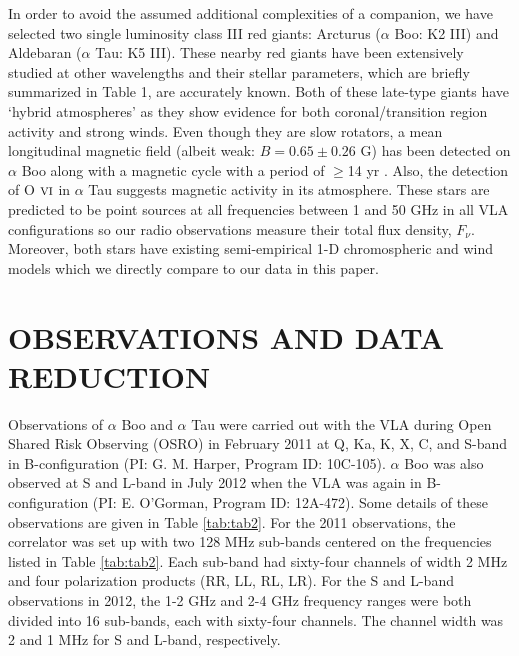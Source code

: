 \documentclass[iop]{emulateapj}
\begin{document}
In order to avoid the assumed additional complexities of a companion, we have selected two single luminosity class III red giants: Arcturus ($\alpha$ Boo: K2 III) and Aldebaran ($\alpha$ Tau: K5 III). These nearby red giants have been extensively studied at other wavelengths and their stellar parameters, which are briefly summarized in Table 1, are accurately known. Both of these late-type giants have `hybrid atmospheres' as they show evidence for both coronal/transition region activity and strong winds. Even though they are slow rotators, a mean longitudinal magnetic field (albeit weak: $B = 0.65 \pm 0.26$ G) has been detected on $\alpha$ Boo \citep{2011A&A...529A.100S} along with a magnetic cycle with a period of $\geq$14 yr \citep{2008ApJ...679.1531B}. Also, the detection of O $\textsc{vi}$ in $\alpha$ Tau \citep{2005ApJ...622..629D} suggests magnetic activity in its atmosphere. These stars are predicted to be point sources at all frequencies between 1 and 50 GHz in all VLA configurations so our radio observations measure their total flux density, $F_{\nu}$. Moreover, both stars have existing semi-empirical 1-D chromospheric and wind models which we directly compare to our data in this paper.

\section{OBSERVATIONS AND DATA REDUCTION}

Observations of $\alpha$ Boo and $\alpha$ Tau were carried out with the VLA during Open Shared Risk Observing (OSRO) in February 2011 at Q, Ka, K, X, C, and S-band in B-configuration (PI: G. M. Harper, Program ID: 10C-105). $\alpha$ Boo was also observed at S and L-band in July 2012 when the VLA was again in B-configuration (PI: E. O'Gorman, Program ID: 12A-472). Some details of these observations are given in Table \ref{tab:tab2}. For the 2011 observations, the correlator was set up with two 128 MHz sub-bands centered on the frequencies listed in Table \ref{tab:tab2}. Each sub-band had sixty-four channels of width 2 MHz and four polarization products (RR, LL, RL, LR). For the S and L-band observations in 2012, the 1-2 GHz and 2-4 GHz frequency ranges were both divided into 16 sub-bands, each with sixty-four channels. The channel width was 2 and 1 MHz for S and L-band, respectively.
\end{document}
